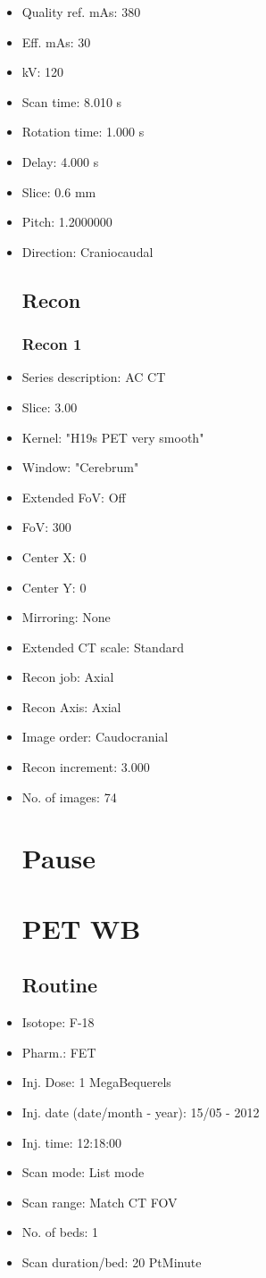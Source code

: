 \documentclass[12pt]{article}
\begin{document}
\begin{itemize}
\subsection{Scan}
\item Quality ref. mAs: 380\item Eff. mAs: 30\item kV: 120\item Scan time: 8.010 s\item Rotation time: 1.000 s\item Delay: 4.000 s\item Slice: 0.6 mm\item Pitch: 1.2000000\item Direction: Craniocaudal
\subsection{Recon}

\subsubsection{Recon 1}
\item Series description: AC CT
\item Slice: 3.00
\item Kernel: "H19s PET very smooth"
\item Window: "Cerebrum"
\item Extended FoV: Off
\item FoV: 300
\item Center X: 0
\item Center Y: 0
\item Mirroring: None
\item Extended CT scale: Standard
\item Recon job: Axial
\item Recon Axis: Axial
\item Image order: Caudocranial
\item Recon increment: 3.000
\item No. of images: 74
\section{Pause}

\section{PET WB}
\subsection{Routine}
\item Isotope: F-18
\item Pharm.: FET
\item Inj. Dose: 1 MegaBequerels
\item Inj. date (date/month - year): 15/05 - 2012
\item Inj. time: 12:18:00
\item Scan mode: List mode
\item Scan range: Match CT FOV
\item No. of beds: 1
\item Scan duration/bed: 20 PtMinute

\end{itemize}
\end{document}
